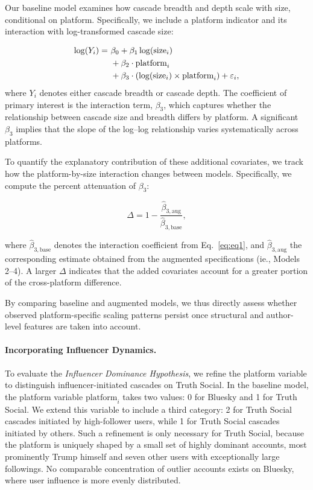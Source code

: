 \documentclass[letterpaper]{article} %
\begin{document}
Our baseline model examines how cascade breadth and depth scale with size, conditional on platform. Specifically, we include a platform indicator and its interaction with log-transformed cascade size:

\begin{align}
\label{eq:eq1}
\log(Y_i) =\ & \beta_0 + \beta_1 \log(\text{size}_i) \notag \\
             & + \beta_2 \cdot \text{platform}_i \notag \\
             & + \beta_3 \cdot \left( \log(\text{size}_i) \times \text{platform}_i \right) + \varepsilon_i ,
\end{align}
where $Y_i$ denotes either cascade breadth or cascade depth.
The coefficient of primary interest is the interaction term, $\beta_3$, which captures whether the relationship between cascade size and breadth differs by platform. A significant $\beta_3$ implies that the slope of the log--log relationship varies systematically across platforms.

To quantify the explanatory contribution of these additional covariates, we track how the platform-by-size interaction changes between models. Specifically, we compute the percent attenuation of $\beta_3$:

\begin{equation}
\Delta = 1 - \frac{\hat{\beta}_{3,\text{aug}}}{\hat{\beta}_{3,\text{base}}} ,
\end{equation}

where $\hat{\beta}_{3,\text{base}}$ denotes the interaction coefficient from Eq.~\ref{eq:eq1}, and $\hat{\beta}_{3,\text{aug}}$ the corresponding estimate obtained from the augmented specifications (ie., Models 2–4). A larger $\Delta$ indicates that the added covariates account for a greater portion of the cross-platform difference.

By comparing baseline and augmented models, we thus directly assess whether observed platform-specific scaling patterns persist once structural and author-level features are taken into account.

\paragraph*{Incorporating Influencer Dynamics.}

To evaluate the \textit{Influencer Dominance Hypothesis}, we refine the platform variable to distinguish influencer-initiated cascades on Truth Social. In the baseline model, the platform variable $\text{platform}_i$ takes two values: 0 for Bluesky and 1 for Truth Social. We extend this variable to include a third category: 2 for Truth Social cascades initiated by high-follower users, while 1 for Truth Social cascades initiated by others. Such a refinement is only necessary for Truth Social, because the platform is uniquely shaped by a small set of highly dominant accounts, most prominently Trump himself and seven other users with exceptionally large followings. No comparable concentration of outlier accounts exists on Bluesky, where user influence is more evenly distributed.
\end{document}
